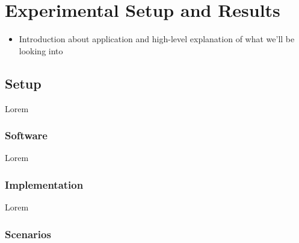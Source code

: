 \chapter{Experimental Setup and Results}
\label{ch:experimental-results}

\begin{itemize}
	\item Introduction about application and high-level explanation of what we'll be looking into
\end{itemize}

\section{Setup}
\label{sec:setup}

Lorem

\subsection{Software}
\label{sec:software}

Lorem

\subsection{Implementation}
\label{sec:implementation}

Lorem

\subsection{Scenarios}
\label{sec:scenarios}

